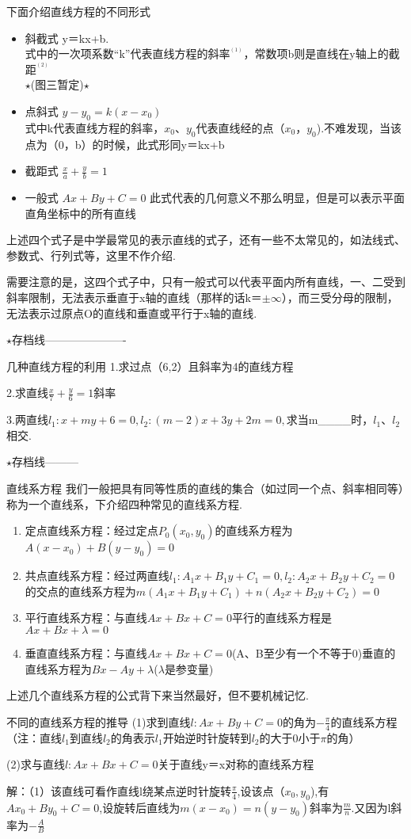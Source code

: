 下面介绍直线方程的不同形式
\begin{itemize}
\item 斜截式
y＝kx+b.
\\式中的一次项系数“k”代表直线方程的斜率$^{^{(1)}}$，常数项b则是直线在y轴上的截距$^{^{(2)}}$ 
\\ $\star$(图三暂定)$\star$
\item 点斜式
$y-y_0=k(x-x_0)$
\\式中k代表直线方程的斜率，$x_0$、$y_0$代表直线经的点（$x_0$，$y_0$).不难发现，当该点为（0，b）的时候，此式形同y＝kx+b
\item 截距式
$\frac{x}{a}+\frac{y}{b}=1$
\item 一般式
$Ax+By+C=0$
此式代表的几何意义不那么明显，但是可以表示平面直角坐标中的所有直线
\end{itemize}
上述四个式子是中学最常见的表示直线的式子，还有一些不太常见的，如法线式、参数式、行列式等，这里不作介绍.

需要注意的是，这四个式子中，只有一般式可以代表平面内所有直线，一、二受到斜率限制，无法表示垂直于x轴的直线（那样的话k＝$\pm \infty$），而三受分母的限制，无法表示过原点O的直线和垂直或平行于x轴的直线.

$\star$存档线----------------------
\begin{exercise}{几种直线方程的利用}
1.求过点（6,2）且斜率为4的直线方程


2.求直线$\frac{x}{7}+\frac{y}{6}=1$斜率

3.两直线$l_1:x+my+6=0,l_2:(m-2)x+3y+2m=0,$求当m____时，$l_1$、$l_2$相交.
\end{exercise}
$\star$存档线---------

直线系方程
我们一般把具有同等性质的直线的集合（如过同一个点、斜率相同等）称为一个直线系，下介绍四种常见的直线系方程.
\begin{enumerate}
\item 定点直线系方程：经过定点$P_0(x_0,y_0)$的直线系方程为$A(x-x_0)+B(y-y_0)=0$
\item 共点直线系方程：经过两直线$l_1:A_1x+B_1y+C_1=0,l_2:A_2x+B_2y+C_2=0$的交点的直线系方程为$m(A_1x+B_1y+C_1)+n(A_2x+B_2y+C_2)=0$
\item 平行直线系方程：与直线$Ax+Bx+C=0$平行的直线系方程是$Ax+Bx+\lambda=0$
\item 垂直直线系方程：与直线$Ax+Bx+C=0$(A、B至少有一个不等于0)垂直的直线系方程为$Bx-Ay+\lambda$($\lambda$是参变量)
\end{enumerate}
上述几个直线系方程的公式背下来当然最好，但不要机械记忆.
\begin{example}{不同的直线系方程的推导}
(1)求到直线$l:Ax+By+C=0$的角为$-\frac{\pi}{4}$的直线系方程
\\（注：直线$l_1$到直线$l_2$的角表示$l_1$开始逆时针旋转到$l_2$的大于0小于$\pi$的角）

(2)求与直线$l:Ax+Bx+C=0$关于直线y＝x对称的直线系方程
\end{example}

解：（1）该直线可看作直线l绕某点逆时针旋转$\frac{\pi}{4}$,设该点（$x_0,y_0$),有$Ax_0+By_0+C=0$,设旋转后直线为$m(x-x_0)=n(y-y_0)$斜率为$\frac{m}{n}$.又因为l斜率为$-\frac{A}{B}$
